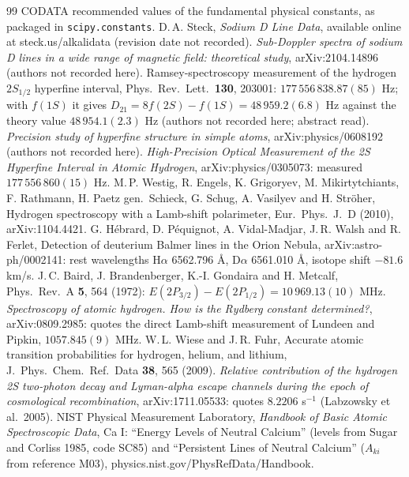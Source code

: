 \begin{thebibliography}{99}
 CODATA recommended values of the fundamental physical constants, as packaged in \texttt{scipy.constants}.
 D.\,A. Steck, \emph{Sodium D Line Data}, available online at steck.us/alkalidata (revision date not recorded).
 \emph{Sub-Doppler spectra of sodium D lines in a wide range of magnetic field: theoretical study}, arXiv:2104.14896 (authors not recorded here).
 Ramsey-spectroscopy measurement of the hydrogen $2S_{1/2}$ hyperfine interval, Phys.\ Rev.\ Lett.\ \textbf{130}, 203001: $177\,556\,838.87(85)$ Hz; with $f(1S)$ it gives $D_{21}=8f(2S)-f(1S)=48\,959.2(6.8)$ Hz against the theory value $48\,954.1(2.3)$ Hz (authors not recorded here; abstract read).
 \emph{Precision study of hyperfine structure in simple atoms}, arXiv:physics/0608192 (authors not recorded here).
 \emph{High-Precision Optical Measurement of the 2S Hyperfine Interval in Atomic Hydrogen}, arXiv:physics/0305073: measured $177\,556\,860(15)$ Hz.
 M.\,P. Westig, R. Engels, K. Grigoryev, M. Mikirtytchiants, F. Rathmann, H. Paetz gen.\ Schieck, G. Schug, A. Vasilyev and H. Str\"oher, Hydrogen spectroscopy with a Lamb-shift polarimeter, Eur.\ Phys.\ J.\ D (2010), arXiv:1104.4421.
 G. H\'ebrard, D. P\'equignot, A. Vidal-Madjar, J.\,R. Walsh and R. Ferlet, Detection of deuterium Balmer lines in the Orion Nebula, arXiv:astro-ph/0002141: rest wavelengths H$\alpha$ 6562.796 \AA, D$\alpha$ 6561.010 \AA, isotope shift $-81.6$ km/s.
 J.\,C. Baird, J. Brandenberger, K.-I. Gondaira and H. Metcalf, Phys.\ Rev.\ A \textbf{5}, 564 (1972): $E(2P_{3/2})-E(2P_{1/2})=10\,969.13(10)$ MHz.
 \emph{Spectroscopy of atomic hydrogen. How is the Rydberg constant determined?}, arXiv:0809.2985: quotes the direct Lamb-shift measurement of Lundeen and Pipkin, $1057.845(9)$ MHz.
 W.\,L. Wiese and J.\,R. Fuhr, Accurate atomic transition probabilities for hydrogen, helium, and lithium, J.\ Phys.\ Chem.\ Ref.\ Data \textbf{38}, 565 (2009).
 \emph{Relative contribution of the hydrogen 2S two-photon decay and Lyman-alpha escape channels during the epoch of cosmological recombination}, arXiv:1711.05533: quotes $8.2206$ s$^{-1}$ (Labzowsky et al.\ 2005).
 NIST Physical Measurement Laboratory, \emph{Handbook of Basic Atomic Spectroscopic Data}, Ca I: ``Energy Levels of Neutral Calcium'' (levels from Sugar and Corliss 1985, code SC85) and ``Persistent Lines of Neutral Calcium'' ($A_{ki}$ from reference M03), physics.nist.gov/PhysRefData/Handbook.

\end{thebibliography}
